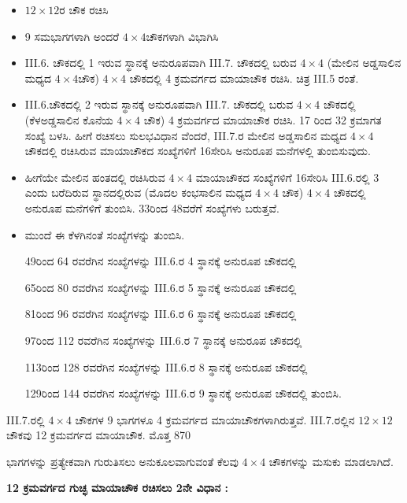 \begin{itemize}
	\item $12 \times 12$ರ ಚೌಕ ರಚಿಸಿ
	\item 9 ಸಮಭಾಗಗಳಾಗಿ ಅಂದರೆ $4 \times 4$ಚೌಕಗಳಾಗಿ ವಿಭಾಗಿಸಿ
	\item  III.6. ಚೌಕದಲ್ಲಿ 1 ಇರುವ ಸ್ಥಾನಕ್ಕೆ ಅನುರೂಪವಾಗಿ  III.7. ಚೌಕದಲ್ಲಿ ಬರುವ $4 \times 4$ (ಮೇಲಿನ ಅಡ್ಡಸಾಲಿನ ಮಧ್ಯದ $4 \times 4$ಚೌಕ) $4 \times 4$ ಚೌಕದಲ್ಲಿ 4 ಕ್ರಮವರ್ಗದ ಮಾಯಾಚೌಕ ರಚಿಸಿ. ಚಿತ್ರ  III.5 ರಂತೆ.
	\item  III.6.ಚೌಕದಲ್ಲಿ 2 ಇರುವ ಸ್ಥಾನಕ್ಕೆ ಅನುರೂಪವಾಗಿ  III.7. ಚೌಕದಲ್ಲಿ ಬರುವ $4 \times 4$ ಚೌಕದಲ್ಲಿ (ಕೆಳಅಡ್ಡಸಾಲಿನ ಕೊನೆಯ $4 \times 4$ ಚೌಕ) 4 ಕ್ರಮವರ್ಗದ ಮಾಯಾಚೌಕ 
	ರಚಿಸಿ. 17 ರಿಂದ 32 ಕ್ರಮಾಗತ ಸಂಖ್ಯೆ ಬಳಸಿ. ಹೀಗೆ ರಚಿಸಲು ಸುಲಭವಿಧಾನ ವೆಂದರೆ,  III.7.ರ ಮೇಲಿನ ಅಡ್ಡಸಾಲಿನ ಮಧ್ಯದ $4 \times 4$ ಚೌಕದಲ್ಲಿ ರಚಿಸಿರುವ ಮಾಯಾಚೌಕದ ಸಂಖ್ಯೆಗಳಿಗೆ 16ಸೇರಿಸಿ ಅನುರೂಪ ಮನೆಗಳಲ್ಲಿ ತುಂಬಿಸುವುದು.
	\item ಹೀಗೆಯೇ ಮೇಲಿನ ಹಂತದಲ್ಲಿ ರಚಿಸಿರುವ $4 \times 4$ ಮಾಯಾಚೌಕದ ಸಂಖ್ಯೆಗಳಿಗೆ 16ಸೇರಿಸಿ  III.6.ರಲ್ಲಿ 3 ಎಂದು ಬರೆದಿರುವ ಸ್ಥಾನದಲ್ಲಿರುವ (ಮೊದಲ ಕಂಭಸಾಲಿನ ಮಧ್ಯದ $4 \times 4$ ಚೌಕ) $4 \times 4$ ಚೌಕದಲ್ಲಿ ಅನುರೂಪ ಮನೆಗಳಿಗೆ ತುಂಬಿಸಿ. 33ರಿಂದ 48ವರೆಗೆ ಸಂಖ್ಯೆಗಳು ಬರುತ್ತವೆ.
	\item ಮುಂದೆ ಈ ಕೆಳಗಿನಂತೆ ಸಂಖ್ಯೆಗಳನ್ನು ತುಂಬಿಸಿ.

	49ರಿಂದ 64 ರವರೆಗಿನ ಸಂಖ್ಯೆಗಳನ್ನು  III.6.ರ 4 ಸ್ಥಾನಕ್ಕೆ ಅನುರೂಪ ಚೌಕದಲ್ಲಿ

	65ರಿಂದ 80 ರವರೆಗಿನ ಸಂಖ್ಯೆಗಳನ್ನು  III.6.ರ 5 ಸ್ಥಾನಕ್ಕೆ ಅನುರೂಪ ಚೌಕದಲ್ಲಿ

	81ರಿಂದ 96 ರವರೆಗಿನ ಸಂಖ್ಯೆಗಳನ್ನು  III.6.ರ 6 ಸ್ಥಾನಕ್ಕೆ ಅನುರೂಪ ಚೌಕದಲ್ಲಿ

	97ರಿಂದ 112 ರವರೆಗಿನ ಸಂಖ್ಯೆಗಳನ್ನು  III.6.ರ 7 ಸ್ಥಾನಕ್ಕೆ ಅನುರೂಪ ಚೌಕದಲ್ಲಿ

	113ರಿಂದ 128 ರವರೆಗಿನ ಸಂಖ್ಯೆಗಳನ್ನು  III.6.ರ 8 ಸ್ಥಾನಕ್ಕೆ ಅನುರೂಪ ಚೌಕದಲ್ಲಿ

	129ರಿಂದ 144 ರವರೆಗಿನ ಸಂಖ್ಯೆಗಳನ್ನು  III.6.ರ 9 ಸ್ಥಾನಕ್ಕೆ ಅನುರೂಪ ಚೌಕದಲ್ಲಿ ತುಂಬಿಸಿ.
\end{itemize}

III.7.ರಲ್ಲಿ $4 \times 4$ ಚೌಕಗಳ 9 ಭಾಗಗಳೂ 4 ಕ್ರಮವರ್ಗದ ಮಾಯಾಚೌಕ\-ಗಳಾಗಿರುತ್ತವೆ.  III.7.ರಲ್ಲಿನ $12 \times 12$ ಚೌಕವು 12 ಕ್ರಮವರ್ಗದ ಮಾಯಾಚೌಕ. ಮೊತ್ತ 870

 ಭಾಗಗಳನ್ನು ಪ್ರತ್ಯೇಕವಾಗಿ ಗುರುತಿಸಲು ಅನುಕೂಲವಾಗುವಂತೆ ಕೆಲವು $4 \times 4$ \linebreak ಚೌಕಗಳನ್ನು ಮಸುಕು ಮಾಡಲಾಗಿದೆ.

\medskip
\noindent \textbf{12 ಕ್ರಮವರ್ಗದ ಗುಚ್ಛ ಮಾಯಾಚೌಕ ರಚಿಸಲು 2ನೇ ವಿಧಾನ :}

